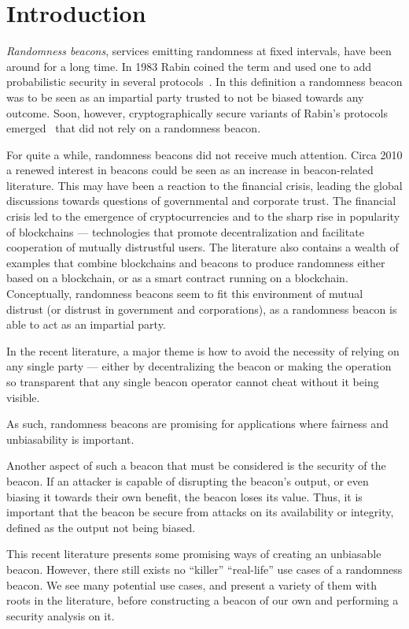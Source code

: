 \section{Introduction}

\emph{Randomness beacons}, services emitting randomness at fixed intervals, have been around for a long time.
In 1983 Rabin coined the term and used one to add probabilistic security in several protocols~\cite{rabin1983transaction}.
In this definition a randomness beacon was to be seen as an impartial party trusted to not be biased towards any outcome.
Soon, however, cryptographically secure variants of Rabin's protocols emerged~ that did not rely on a randomness beacon.

For quite a while, randomness beacons did not receive much attention.
Circa 2010 a renewed interest in beacons could be seen as an increase in beacon-related literature.
This may have been a reaction to the financial crisis, leading the global discussions towards questions of governmental and corporate trust.
The financial crisis led to the emergence of cryptocurrencies and to the sharp rise in popularity of blockchains --- technologies that promote decentralization and facilitate cooperation of mutually distrustful users.
The literature also contains a wealth of examples that combine blockchains and beacons to produce randomness either based on a blockchain, or as a smart contract running on a blockchain.
Conceptually, randomness beacons seem to fit this environment of mutual distrust (or distrust in government and corporations), as a randomness beacon is able to act as an impartial party.

In the recent literature, a major theme is how to avoid the necessity of relying on any single party --- either by decentralizing the beacon or making the operation so transparent that any single beacon operator cannot cheat without it being visible.

As such, randomness beacons are promising for applications where fairness and unbiasability is important.

Another aspect of such a beacon that must be considered is the security of the beacon.
If an attacker is capable of disrupting the beacon's output, or even biasing it towards their own benefit, the beacon loses its value.
Thus, it is important that the beacon be secure from attacks on its availability or integrity, defined as the output not being biased.

This recent literature presents some promising ways of creating an unbiasable beacon.  However, there still exists no \enquote{killer} \enquote{real-life} use cases of a randomness beacon.
We see many potential use cases, and present a variety of them with roots in the literature, before constructing a beacon of our own and performing a security analysis on it.
